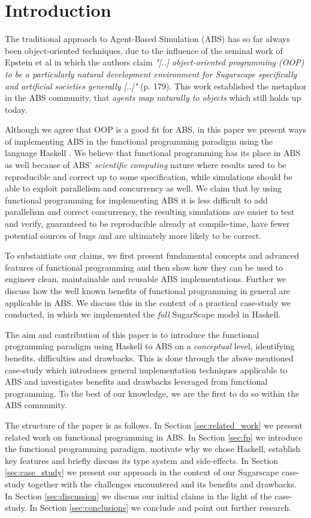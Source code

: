 \section{Introduction}
The traditional approach to Agent-Based Simulation (ABS) has so far always been object-oriented techniques, due to the influence of the seminal work of Epstein et al \cite{epstein_growing_1996} in which the authors claim \textit{"[..] object-oriented programming (OOP) to be a particularly natural development environment for Sugarscape specifically and artificial societies generally [..]"} (p. 179). This work established the metaphor in the ABS community, that \textit{agents map naturally to objects} \cite{north_managing_2007} which still holds up today. 

Although we agree that OOP is a good fit for ABS, in this paper we present ways of implementing ABS in the functional programming paradigm using the language Haskell \cite{hudak_history_2007}. We believe that functional programming has its place in ABS as well because of ABS' \textit{scientific computing} nature where results need to be reproducible and correct up to some specification, while simulations should be able to exploit parallelism and concurrency as well. 
We claim that by using functional programming for implementing ABS it is less difficult to add parallelism and correct concurrency, the resulting simulations are easier to test and verify, guaranteed to be reproducible already at compile-time, have fewer potential sources of bugs and are ultimately more likely to be correct. 

To substantiate our claims, we first present fundamental concepts and advanced features of functional programming and then show how they can be used to engineer clean, maintainable and reusable ABS implementations. Further we discuss how the well known benefits of functional programming in general are applicable in ABS. We discuss this in the context of a practical case-study we conducted, in which we implemented the \textit{full} SugarScape model \cite{epstein_growing_1996} in Haskell. 

The aim and contribution of this paper is to introduce the functional programming paradigm using Haskell to ABS on a \textit{conceptual} level, identifying benefits, difficulties and drawbacks. This is done through the above mentioned case-study which introduces general implementation techniques applicable to ABS and investigates benefits and drawbacks leveraged from functional programming. To the best of our knowledge, we are the first to do so within the ABS community.

The structure of the paper is as follows. 
In Section \ref{sec:related_work} we present related work on functional programming in ABS. 
In Section \ref{sec:fp} we introduce the functional programming paradigm, motivate why we chose Haskell, establish key features and briefly discuss its type system and side-effects. 
In Section \ref{sec:case_study} we present our approach in the context of our Sugarscape case-study together with the challenges encountered and its benefits and drawbacks.
In Section \ref{sec:discussion} we discuss our initial claims in the light of the case-study.
In Section \ref{sec:conclusions} we conclude and point out further research.